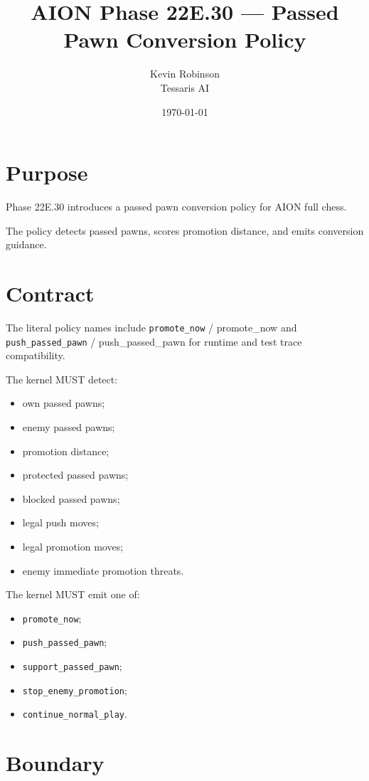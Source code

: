 \documentclass[11pt,a4paper]{article}
\title{\textbf{AION Phase 22E.30 --- Passed Pawn Conversion Policy}}
\author{Kevin Robinson\\Tessaris AI}
\date{\today}
\begin{document}
\maketitle

\section{Purpose}

Phase 22E.30 introduces a passed pawn conversion policy for AION full chess.

The policy detects passed pawns, scores promotion distance, and emits conversion guidance.

\section{Contract}

The literal policy names include \texttt{promote\_now} / promote_now and \texttt{push\_passed\_pawn} / push_passed_pawn for runtime and test trace compatibility.


The kernel MUST detect:

\begin{itemize}[leftmargin=*]
  \item own passed pawns;
  \item enemy passed pawns;
  \item promotion distance;
  \item protected passed pawns;
  \item blocked passed pawns;
  \item legal push moves;
  \item legal promotion moves;
  \item enemy immediate promotion threats.
\end{itemize}

The kernel MUST emit one of:

\begin{itemize}[leftmargin=*]
  \item \texttt{promote\_now};
  \item \texttt{push\_passed\_pawn};
  \item \texttt{support\_passed\_pawn};
  \item \texttt{stop\_enemy\_promotion};
  \item \texttt{continue\_normal\_play}.
\end{itemize}

\section{Boundary}
\end{document}
